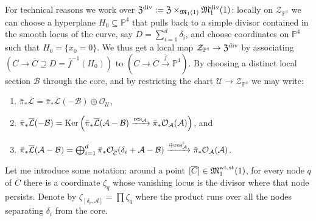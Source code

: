 \documentclass[11pt]{amsart}
\newcommand{\pazocal}{\mathcal}
\newcommand{\PP}{\mathbb P}
\newcommand{\OO}{\mathcal{O}}
\renewcommand{\to}{\rightarrow}
\newcommand{\MM}{\mathfrak M}
\newcommand{\hL}{\overline{\mathcal{L}}}
\theoremstyle{definition}
\theoremstyle{definition}
\begin{document}
For technical reasons we work over $\mathfrak Z^{\rm{div}}:=\mathfrak Z\times_{\MM_1(1)}\MM_1^{\textrm{div}}(1)$: locally on $\mathcal Z_{\PP^4}$ we can choose a hyperplane $H_0\subseteq\PP^4$ that pulls back to a simple divisor contained in the smooth locus of the curve, say $D=\sum_{i=1}^d \delta_i$, and choose coordinates on $\PP^4$ such that $H_0=\{x_0=0\}$. We thus get a local map $\mathcal Z_{\PP^4}\to \mathfrak Z^{\rm{div}}$ by associating $(C\to\overline{C}\supseteq D=\bar{f}^{-1}(H_0))$ to $(C\to \overline{C}\xrightarrow{\bar{f}}\PP^4)$. By choosing a distinct local section $\mathcal B$ through the core, and by restricting the chart $\mathcal U\to\mathcal Z_{\PP^4}$ we may write:
\begin{enumerate}
 \item $\bar{\pi}_*\hL=\bar{\pi}_*\hL(-\mathcal B)\oplus\OO_{\mathcal U}$,
 \item $\bar{\pi}_*\hL(-\mathcal B)=\operatorname{Ker}\left(\bar{\pi}_*\hL(\mathcal A-\mathcal B)\xrightarrow{\rm{res}_{\mathcal A}}\bar{\pi}_*\OO_{\mathcal A}(\mathcal A)\right)$, and
 \item $\bar{\pi}_*\hL(\mathcal A-\mathcal B)=\bigoplus_{i=1}^d \bar{\pi}_*\OO_{\overline{\mathcal C}}(\delta_i+\mathcal A-\mathcal B)\xrightarrow{\oplus \rm{res}^i_{\mathcal A}}\bar{\pi}_*\OO_{\mathcal A}(\mathcal A)$.
\end{enumerate}

Let me introduce some notation: around a point $[\overline{C}]\in\MM_1^{\rm{wt,st}}(1)$, for every node $q$ of $\overline{C}$ there is a coordinate $\zeta_q$ whose vanishing locus is the divisor where that node persists. Denote by $\zeta_{[\delta_i,\pazocal A]}=\prod\zeta_q$
where the product runs over all the nodes separating $\delta_i$ from the core.
 
\end{document}
